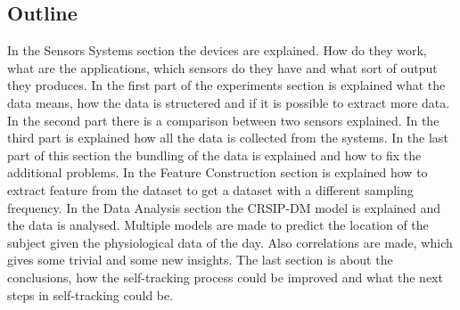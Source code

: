 	\subsection{Outline}
		In the Sensors Systems section the devices are explained. How do they work, what are the applications, which sensors do they have and what sort of output they produces. In the first part of the experiments section is explained what the data means, how the data is structered and if it is possible to extract more data. In the second part there is a comparison between two sensors explained. In the third part is explained how all the data is collected from the systems. In the last part of this section the bundling of the data is explained and how to fix the additional problems. In the Feature Construction section is explained how to extract feature from the dataset to get a dataset with a different sampling frequency. In the Data Analysis section the CRSIP-DM model is explained and the data is analysed. Multiple models are made to predict the location of the subject given the physiological data of the day. Also correlations are made, which gives some trivial and some new insights. The last section is about the conclusions, how the self-tracking process could be improved and what the next steps in self-tracking could be.
		
	
	\iffalse
		Klad		


		It's important to explain which systems are being used, what the data means and how the data looks like. Next section there is a comparison between the two physiological devices, what was really useful to learn the devices. The data collection is the most important part of the thesis, because it's explaining how everything was set up and done to get the provided dataset. - Modeling - Conclusions 

		In the Sensor System section the hardware is explained, what the sensors does, what the applications are and how it works. 
		In the experiments section describes useful derivative data, a comparison between the two physiological devices and the experiment to combine all three devices to a good dataset.
		Modeling: I made a dataset of 15 days with all kind of features. Set the deep sleep as target attribute and use WeKa to make a model, with a discussion why deep sleep as target, how the algorithm works and hopefully some insights of the model. 
	\fi
